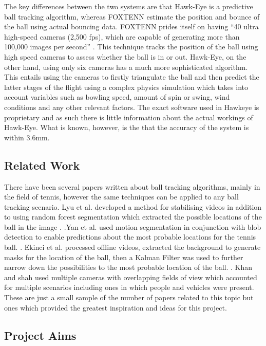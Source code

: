 \documentclass{article}
\begin{document}
The key differences between the two systems are that Hawk-Eye is a predictive ball tracking algorithm, whereas FOXTENN estimate the position and bounce of the ball using actual bouncing data. FOXTENN prides itself on having “40 ultra high-speed cameras (2,500 fps), which are capable of generating more than 100,000 images per second” \cite{FOXTENN} . This technique tracks the position of the ball using high speed cameras to assess whether the ball is in or out. Hawk-Eye, on the other hand, using only six cameras has a much more sophisticated algorithm. This entails using the cameras to firstly triangulate the ball and then predict the latter stages of the flight using a complex physics simulation which takes into account variables such as bowling speed, amount of spin or swing, wind conditions and any other relevant factors. The exact software used in Hawkeye is proprietary and as such there is little information about the actual workings of Hawk-Eye. What is known, however, is the that the accuracy of the system is within 3.6mm. 

\subsection{Related Work}

There have been several papers written about ball tracking algorithms, mainly in the field of tennis, however the same techniques can be applied to any ball tracking scenario. 
Lyu et al. developed a method for stabilising videos in addition to using random forest segmentation which extracted the possible locations of the ball in the image \cite{2}. .Yan et al. used motion segmentation in conjunction with blob detection to enable predictions about the most probable locations for the tennis ball. \cite{4}. Ekinci et al. processed offline videos, extracted the background to generate masks for the location of the ball, then a Kalman Filter was used to further narrow down the possibilities to the most probable location of the ball. \cite{5}. Khan and shah used multiple cameras with overlapping fields of view which accounted for multiple scenarios including ones in which people and vehicles were present. These are just a small sample of the number of papers related to this topic but ones which provided the greatest inspiration and ideas for this project. 

\subsection{Project Aims}
\end{document}
